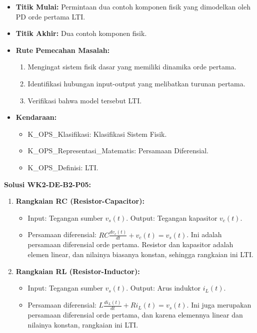 \documentclass[
  letterpaper,
  DIV=11,
  numbers=noendperiod]{scrreprt}
\providecommand{\tightlist}{%
  \setlength{\itemsep}{0pt}\setlength{\parskip}{0pt}}
\begin{document}
\begin{itemize}
\tightlist
\item
  \textbf{Titik Mulai:} Permintaan dua contoh komponen fisik yang
  dimodelkan oleh PD orde pertama LTI.
\item
  \textbf{Titik Akhir:} Dua contoh komponen fisik.
\item
  \textbf{Rute Pemecahan Masalah:}

  \begin{enumerate}
  \def\labelenumi{\arabic{enumi}.}
  \tightlist
  \item
    Mengingat sistem fisik dasar yang memiliki dinamika orde pertama.
  \item
    Identifikasi hubungan input-output yang melibatkan turunan pertama.
  \item
    Verifikasi bahwa model tersebut LTI.
  \end{enumerate}
\item
  \textbf{Kendaraan:}

  \begin{itemize}
  \tightlist
  \item
    K\_OPS\_Klasifikasi: Klasifikasi Sistem Fisik.
  \item
    K\_OPS\_Representasi\_Matematis: Persamaan Diferensial.
  \item
    K\_OPS\_Definisi: LTI.
  \end{itemize}
\end{itemize}

\textbf{Solusi WK2-DE-B2-P05:}

\begin{enumerate}
\def\labelenumi{\arabic{enumi}.}
\tightlist
\item
  \textbf{Rangkaian RC (Resistor-Capacitor):}

  \begin{itemize}
  \tightlist
  \item
    Input: Tegangan sumber \(v_s(t)\). Output: Tegangan kapasitor
    \(v_c(t)\).
  \item
    Persamaan diferensial: \(RC \frac{dv_c(t)}{dt} + v_c(t) = v_s(t)\).
    Ini adalah persamaan diferensial orde pertama. Resistor dan
    kapasitor adalah elemen linear, dan nilainya biasanya konstan,
    sehingga rangkaian ini LTI.
  \end{itemize}
\item
  \textbf{Rangkaian RL (Resistor-Inductor):}

  \begin{itemize}
  \tightlist
  \item
    Input: Tegangan sumber \(v_s(t)\). Output: Arus induktor \(i_L(t)\).
  \item
    Persamaan diferensial: \(L \frac{di_L(t)}{dt} + R i_L(t) = v_s(t)\).
    Ini juga merupakan persamaan diferensial orde pertama, dan karena
    elemennya linear dan nilainya konstan, rangkaian ini LTI.
  \end{itemize}
\end{enumerate}
\end{document}
